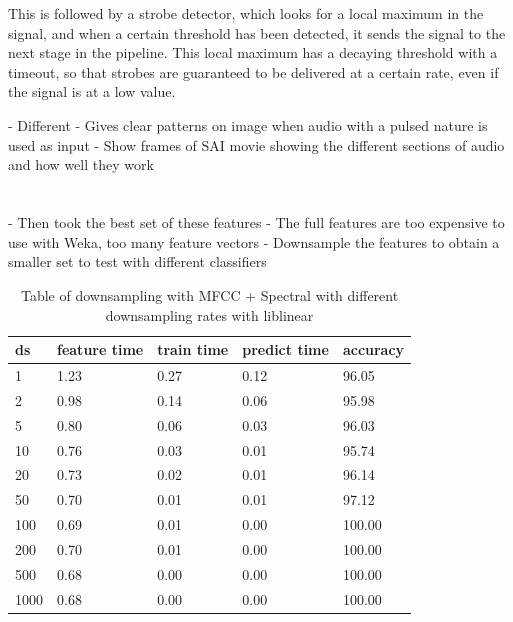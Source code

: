 \documentclass[12pt,oneside]{book}
\begin{document}
This is followed by a strobe detector, which looks for a local maximum
in the signal, and when a certain threshold has been detected, it
sends the signal to the next stage in the pipeline.  This local
maximum has a decaying threshold with a timeout, so that strobes are
guaranteed to be delivered at a certain rate, even if the signal is at
a low value.


- Different 
- Gives clear patterns on image when audio with a pulsed nature is
  used as input
- Show frames of SAI movie showing the different sections of audio and
  how well they work




\begin{table}
\begin{tabular}{|l|l|l|}
\hline


\hline
\end{tabular}
\caption{}
\label{table:obv-6-SAI}
\end{table}




%
%


- Then took the best set of these features 
- The full features are too expensive to use with Weka, too many
feature vectors
- Downsample the features to obtain a smaller set to test with
different classifiers


\begin{table}
\begin{tabular}{|l|l|l|l|l|}
\hline
ds              & feature time    &train time      & predict time    & accuracy        \\
\hline
1               & 1.23            & 0.27            & 0.12            & 96.05           \\
2               & 0.98            & 0.14            & 0.06            & 95.98           \\
5               & 0.80            & 0.06            & 0.03            & 96.03           \\
10              & 0.76            & 0.03            & 0.01            & 95.74           \\
20              & 0.73            & 0.02            & 0.01            & 96.14           \\
50              & 0.70            & 0.01            & 0.01            & 97.12           \\
100             & 0.69            & 0.01            & 0.00            & 100.00          \\
200             & 0.70            & 0.01            & 0.00            & 100.00          \\
500             & 0.68            & 0.00            & 0.00            & 100.00          \\
1000            & 0.68            & 0.00            & 0.00            & 100.00          \\


\hline
\end{tabular}
\caption{Table of downsampling with MFCC + Spectral with different
  downsampling rates with liblinear}
\label{table:obv-7-downsampling}
\end{table}
\end{document}
